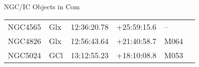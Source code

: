 \begin{block}{NGC/IC Objects in Com}
  \centering
  \begin{tabularx}{\textwidth}{llrrll} 
    NGC4565 & Glx & 12:36:20.78 & +25:59:15.6  & -- \\ 
    NGC4826 & Glx & 12:56:43.64 & +21:40:58.7  & M064 \\ 
    NGC5024 & GCl & 13:12:55.23 & +18:10:08.8  & M053 \\ 
  \end{tabularx}
\end{block}